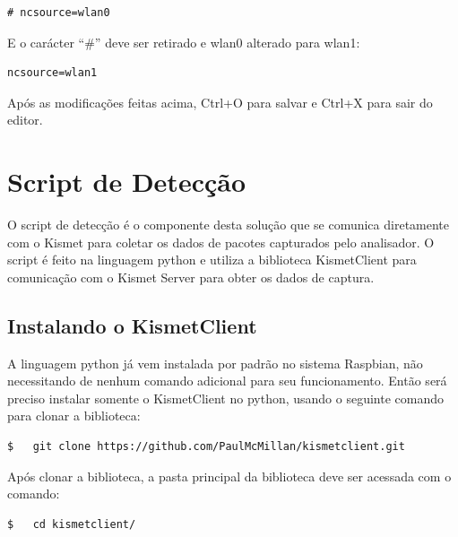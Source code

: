 \begin{lstlisting}
# ncsource=wlan0
\end{lstlisting}

E o carácter ``\#'' deve ser retirado e wlan0 alterado para wlan1: \\

\begin{lstlisting}
ncsource=wlan1
\end{lstlisting}

Após as modificações feitas acima, Ctrl+O para salvar e Ctrl+X para sair do editor.

\section{Script de Detecção}
\label{sec:script-deteccao}

O script de detecção é o componente desta solução que se comunica diretamente com o Kismet para coletar os dados de pacotes capturados pelo analisador. O script é feito na linguagem python e utiliza a biblioteca KismetClient para comunicação com o Kismet Server para obter os dados de captura.


\subsection{Instalando o KismetClient}
\label{sec:instalando-kismetclient}

A linguagem python já vem instalada por padrão no sistema Raspbian, não necessitando de nenhum comando adicional para seu funcionamento. Então será preciso instalar somente o KismetClient no python, usando o seguinte comando para clonar a biblioteca: \\

\begin{lstlisting}[language=bash]
$   git clone https://github.com/PaulMcMillan/kismetclient.git
\end{lstlisting}

Após clonar a biblioteca, a pasta principal da biblioteca deve ser acessada com o comando: \\

\begin{lstlisting}[language=bash]
$   cd kismetclient/
\end{lstlisting}

